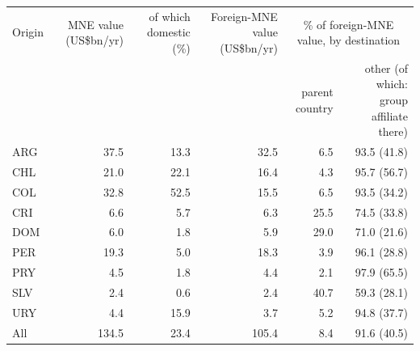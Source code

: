 \begin{tabular}{lrrrrr}
\toprule
Origin & MNE value (US\$bn/yr) & of which domestic (\%) & Foreign-MNE value (US\$bn/yr) & \multicolumn{2}{c}{\% of foreign-MNE value, by destination} \\
 & & & & parent country & other (of which: group affiliate there) \\
\midrule
ARG & 37.5 & 13.3 & 32.5 & 6.5 & 93.5 (41.8) \\
CHL & 21.0 & 22.1 & 16.4 & 4.3 & 95.7 (56.7) \\
COL & 32.8 & 52.5 & 15.5 & 6.5 & 93.5 (34.2) \\
CRI & 6.6 & 5.7 & 6.3 & 25.5 & 74.5 (33.8) \\
DOM & 6.0 & 1.8 & 5.9 & 29.0 & 71.0 (21.6) \\
PER & 19.3 & 5.0 & 18.3 & 3.9 & 96.1 (28.8) \\
PRY & 4.5 & 1.8 & 4.4 & 2.1 & 97.9 (65.5) \\
SLV & 2.4 & 0.6 & 2.4 & 40.7 & 59.3 (28.1) \\
URY & 4.4 & 15.9 & 3.7 & 5.2 & 94.8 (37.7) \\
\midrule
All & 134.5 & 23.4 & 105.4 & 8.4 & 91.6 (40.5) \\
\bottomrule
\end{tabular}
